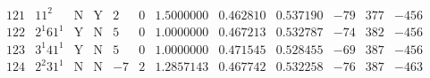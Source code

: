 \documentclass[11pt,reqno,a4letter]{article}
\numberwithin{figure}{section}
\numberwithin{table}{section}
\theoremstyle{plain}
\numberwithin{theorem}{section}
\theoremstyle{definition}
\begin{document}
\begin{table}[ht]
\begin{equation*}
{\begin{array}{cc|cc|ccc|cc|ccc}
 121 & 11^2 & \text{N} & \text{Y} & 2 & 0 & 1.5000000 & 0.462810 & 0.537190 & -79 & 377 & -456 \\
 122 & 2^1 61^1 & \text{Y} & \text{N} & 5 & 0 & 1.0000000 & 0.467213 & 0.532787 & -74 & 382 & -456 \\
 123 & 3^1 41^1 & \text{Y} & \text{N} & 5 & 0 & 1.0000000 & 0.471545 & 0.528455 & -69 & 387 & -456 \\
 124 & 2^2 31^1 & \text{N} & \text{N} & -7 & 2 & 1.2857143 & 0.467742 & 0.532258 & -76 & 387 & -463 \\ 
\end{array}
}
\end{equation*}
\clearpage 

\end{table} 


\newpage
\begin{table}[ht]

\centering


\end{table}
\end{document}
